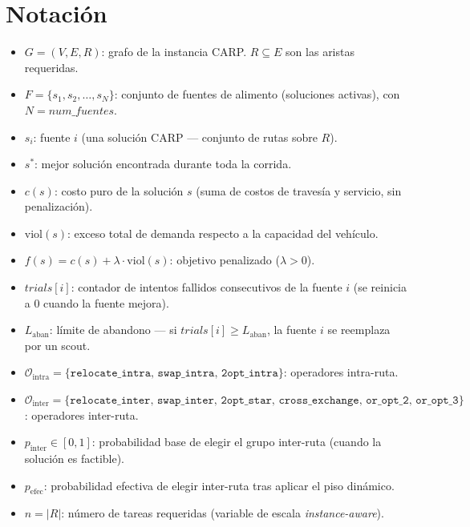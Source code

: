 \documentclass[12pt, a4paper]{article}
\begin{document}
\section{Notación}

\begin{itemize}
    \item $G = (V, E, R)$: grafo de la instancia CARP. $R \subseteq E$ son las
          aristas requeridas.
    \item $F = \{s_1, s_2, \ldots, s_{N}\}$: conjunto de fuentes de alimento
          (soluciones activas), con $N = \mathit{num\_fuentes}$.
    \item $s_i$: fuente $i$ (una solución CARP --- conjunto de rutas sobre $R$).
    \item $s^{*}$: mejor solución encontrada durante toda la corrida.
    \item $c(s)$: costo puro de la solución $s$ (suma de costos de travesía y
          servicio, sin penalización).
    \item $\mathrm{viol}(s)$: exceso total de demanda respecto a la capacidad del
          vehículo.
    \item $f(s) = c(s) + \lambda \cdot \mathrm{viol}(s)$: objetivo penalizado
          ($\lambda > 0$).
    \item $\mathit{trials}[i]$: contador de intentos fallidos consecutivos de
          la fuente $i$ (se reinicia a 0 cuando la fuente mejora).
    \item $L_{\mathrm{aban}}$: límite de abandono — si $\mathit{trials}[i] \geq
          L_{\mathrm{aban}}$, la fuente $i$ se reemplaza por un scout.
    \item $\mathcal{O}_{\mathrm{intra}} = \{\texttt{relocate\_intra},\,
          \texttt{swap\_intra},\, \texttt{2opt\_intra}\}$: operadores
          intra-ruta.
    \item $\mathcal{O}_{\mathrm{inter}} = \{\texttt{relocate\_inter},\,
          \texttt{swap\_inter},\, \texttt{2opt\_star},\,
          \texttt{cross\_exchange},\, \texttt{or\_opt\_2},\,
          \texttt{or\_opt\_3}\}$: operadores inter-ruta.
    \item $p_{\mathrm{inter}} \in [0,1]$: probabilidad base de elegir el grupo
          inter-ruta (cuando la solución es factible).
    \item $p_{\mathrm{efec}}$: probabilidad efectiva de elegir inter-ruta tras
          aplicar el piso dinámico.
    \item $n = |R|$: número de tareas requeridas (variable de escala
          \emph{instance-aware}).
\end{itemize}
\end{document}
